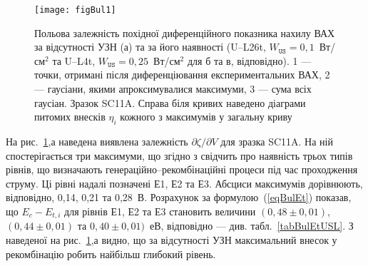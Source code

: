 \begin{figure}
\center
\texttt{[image: figBul1]}
\caption{\label{figBul1}
Польова залежність похідної диференційного показника нахилу ВАХ за відсутності УЗН (а)
та за його наявності (U--L26t, $W_\mathtt{US}=0,1$~Вт/см$^2$ та U--L4t,  $W_\mathtt{US}=0,25$~Вт/см$^2$ для б та в, відповідно).
1 --- точки, отримані після диференціювання експериментальних ВАХ,
2 --- гаусіани, якими апроксимувалися максимуми,
3 --- сума всіх гаусіан.
Зразок SC11A.
Справа біля кривих наведено діаграми питомих внесків $\eta_i$ кожного з максимумів у загальну криву
}%
\end{figure}

На рис.~\ref{figBul1},а наведена виявлена залежність $\partial \zeta/ \partial V $ для зразка SC11A.
На ній спостерігається три максимуми, що згідно з \cite{Bulyar} свідчить про наявність
трьох типів рівнів, що визначають генераційно--рекомбінаційні процеси під час проходження струму.
Ці рівні надалі позначені Е1, Е2 та Е3.
Абсциси максимумів дорівнюють, відповідно, 0,14, 0,21 та 0,28~В.
Розрахунок за формулою~(\ref{eqBulEt}) показав,
що  $E_c-E_{t,i}$ для рівнів  Е1, Е2 та Е3 становить величини $(0,48\pm0,01)$, $(0,44\pm0,01)$ та $0,40\pm0,01)$~еВ, відповідно --- див. табл.~\ref{tabBulEtUSL}.
З наведеної на рис.~\ref{figBul1},а видно, що за відсутності УЗН максимальний внесок у рекомбінацію робить найбільш глибокий рівень.





